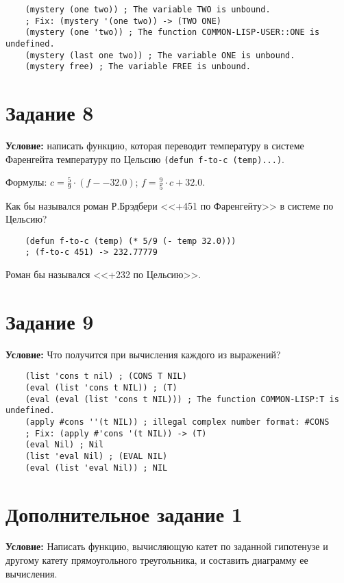 \begin{lstlisting}
	(mystery (one two)) ; The variable TWO is unbound.
	; Fix: (mystery '(one two)) -> (TWO ONE)
	(mystery (one 'two)) ; The function COMMON-LISP-USER::ONE is undefined.
	(mystery (last one two)) ; The variable ONE is unbound.
	(mystery free) ; The variable FREE is unbound.
\end{lstlisting}


\section{Задание 8}

\textbf{Условие:} написать функцию, которая переводит температуру в системе Фаренгейта температуру по Цельсию \texttt{(defun f-to-c (temp)...)}. 

Формулы: $c = \frac{5}{9} \cdot (f -- 32.0)$; $f= \frac{9}{5} \cdot c + 32.0$. 

Как бы назывался роман Р.Брэдбери <<+451 по Фаренгейту>> в системе по Цельсию?

\begin{lstlisting}
	(defun f-to-c (temp) (* 5/9 (- temp 32.0)))
	; (f-to-c 451) -> 232.77779
\end{lstlisting}

Роман бы назывался <<+232 по Цельсию>>.


\section{Задание 9}

\textbf{Условие:} Что получится при вычисления каждого из выражений?

\begin{lstlisting}
	(list 'cons t nil) ; (CONS T NIL)
	(eval (list 'cons t NIL)) ; (T)
	(eval (eval (list 'cons t NIL))) ; The function COMMON-LISP:T is undefined.
	(apply #cons ''(t NIL)) ; illegal complex number format: #CONS
	; Fix: (apply #'cons '(t NIL)) -> (T)
	(eval Nil) ; Nil
	(list 'eval Nil) ; (EVAL NIL)
	(eval (list 'eval Nil)) ; NIL
\end{lstlisting}


\section{Дополнительное задание 1}

\textbf{Условие:} Написать функцию, вычисляющую катет по заданной гипотенузе и другому катету прямоугольного треугольника, и составить диаграмму ее вычисления.

